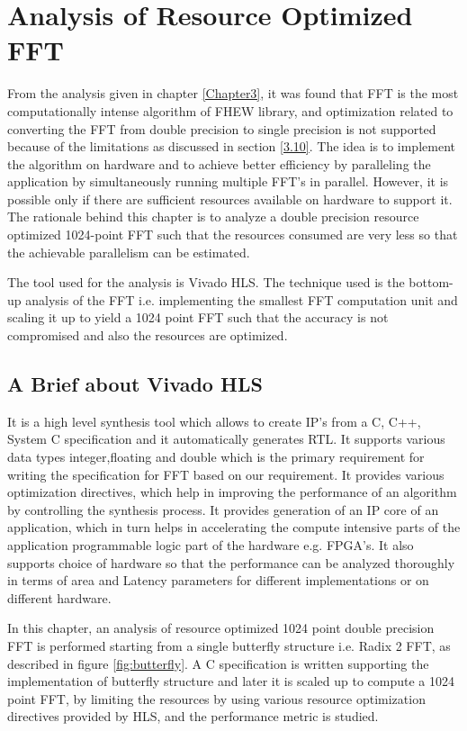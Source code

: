 \chapter{Analysis of Resource Optimized FFT}\label{Chapter4}
From the analysis given in chapter \ref{Chapter3}, it was found that FFT is the most computationally intense algorithm of FHEW library, and optimization related to converting the FFT from double precision to single precision is not supported  because of the limitations as discussed in section \ref{3.10}. The idea is to implement the algorithm on hardware and to achieve better efficiency by paralleling the application by simultaneously running multiple FFT's in parallel. However, it is possible only if there are sufficient resources available on hardware to support it. The rationale behind this chapter is to analyze a double precision resource optimized 1024-point FFT such that the resources consumed are very less so that the achievable parallelism can be estimated.

\noindent The tool used for the analysis is Vivado HLS. The technique used is the bottom-up analysis of the FFT i.e. implementing the smallest FFT computation unit and scaling it up to yield a 1024 point FFT such that the accuracy is not compromised and also the resources are optimized. 
\section{A Brief about Vivado HLS}
It is a high level synthesis tool which allows to create IP's from a C, C++, System C specification and it automatically generates RTL. It supports various data types integer,floating and double which is the primary requirement for writing the specification for FFT based on our requirement. It provides various optimization directives, which help in improving the performance of an algorithm by controlling the synthesis process. It provides generation of an IP core of an application, which in turn helps in accelerating the compute intensive parts of the application programmable logic part of the hardware e.g. FPGA's. It also supports choice of hardware so that the performance can be analyzed thoroughly in terms of area and Latency parameters for different implementations or on different hardware. 

In this chapter, an analysis of resource optimized 1024 point double precision FFT is performed starting from a single butterfly structure i.e. Radix 2 FFT, as described in figure \ref{fig:butterfly}. A C specification is written supporting the implementation of butterfly structure and later it is scaled up to compute a 1024 point FFT, by limiting the resources by using various resource optimization directives provided by HLS, and the performance metric is studied.


